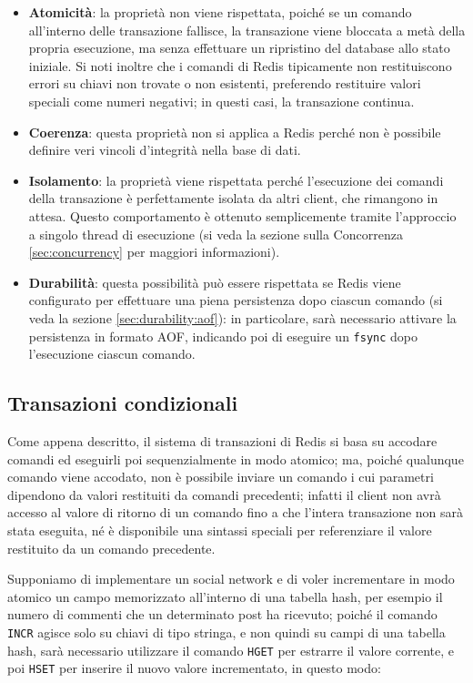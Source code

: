 \begin{itemize}
	\medskip
	\item \textbf{Atomicità}: la proprietà non viene rispettata, poiché se un comando all'interno
	delle transazione fallisce, la transazione viene bloccata a metà della propria esecuzione,
	ma senza effettuare un ripristino del database allo stato iniziale. Si noti inoltre che i
	comandi di Redis tipicamente non restituiscono errori su chiavi non trovate o non esistenti, 
	preferendo restituire valori speciali come numeri negativi; in questi casi, la transazione
	continua. 
	\item \textbf{Coerenza}: questa proprietà non si applica a Redis perché non è possibile definire 
	veri vincoli d'integrità nella base di dati.
	\item \textbf{Isolamento}: la proprietà viene rispettata perché l'esecuzione dei comandi
	della transazione è perfettamente isolata da altri client, che rimangono in attesa. Questo
	comportamento è ottenuto semplicemente tramite l'approccio a singolo thread di esecuzione (si
	veda la sezione sulla Concorrenza \ref{sec:concurrency} per maggiori informazioni).
	\item \textbf{Durabilità}: questa possibilità può essere rispettata se Redis viene configurato
	per effettuare una piena persistenza dopo ciascun comando (si veda la sezione
	\ref{sec:durability:aof}): in particolare, sarà necessario attivare la persistenza in formato
	AOF, indicando poi di eseguire un \verb|fsync| dopo l'esecuzione ciascun comando.
\end{itemize}


\subsection{Transazioni condizionali}

Come appena descritto, il sistema di transazioni di Redis si basa su accodare comandi ed eseguirli
poi sequenzialmente in modo atomico; ma, poiché qualunque comando viene accodato, non è possibile
inviare un comando i cui parametri dipendono da valori restituiti da comandi precedenti; infatti il
client non avrà accesso al valore di ritorno di un comando fino a che l'intera transazione non sarà
stata eseguita, né è disponibile una sintassi speciali per referenziare il valore restituito da un
comando precedente.

Supponiamo di implementare un social network e di voler incrementare in modo atomico 
un campo memorizzato all'interno di una tabella hash, per esempio il numero di commenti che un
determinato post ha ricevuto; poiché il comando \verb|INCR| agisce solo su chiavi di tipo stringa,
e non quindi su campi di una tabella hash, sarà necessario utilizzare il comando \verb|HGET|
per estrarre il valore corrente, e poi \verb|HSET| per inserire il nuovo valore incrementato,
in questo modo:

